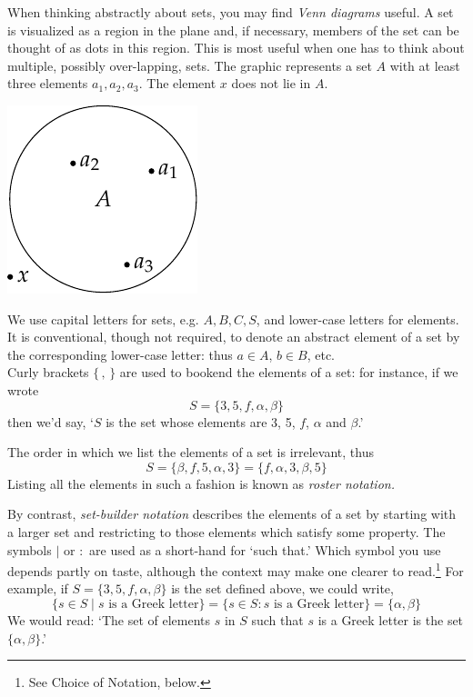 \begin{minipage}[t]{0.73\linewidth}\vspace{0pt}
	When thinking abstractly about sets, you may find \emph{Venn diagrams} useful. A set is visualized as a region in the plane and, if necessary, members of the set can be thought of as dots in this region. This is most useful when one has to think about multiple, possibly over-lapping, sets. The graphic represents a set $A$ with at least three elements $a_1,a_2,a_3$. The element $x$ does not lie in $A$. 
	\vspace{5pt}
\end{minipage}
\hfill
\begin{minipage}[t]{0.25\linewidth}\vspace{0pt}
	\flushright\includegraphics[scale=1]{sets-01-venn}
\end{minipage}



We use capital letters for sets, e.g. $A,B,C,S$, and lower-case letters for elements. It is conventional, though not required, to denote an abstract element of a set by the corresponding lower-case letter: thus $a\in A$, $b\in B$, etc.\\
Curly brackets $\{\,,\,\}$ are used to bookend the elements of a set: for instance, if we wrote
\[
	S=\{3,5,f,\alpha,\beta\}
\]
then we'd say, `$S$ is the set whose elements are 3, 5, $f$, $\alpha$ and $\beta$.'\par
The order in which we list the elements of a set is irrelevant, thus
\[
	S=\{\beta,f,5,\alpha,3\}=\{f,\alpha,3,\beta,5\}
\]
Listing all the elements in such a fashion is known as \emph{roster notation.}

By contrast, \emph{set-builder notation} describes the elements of a set by starting with a larger set and restricting to those elements which satisfy some property. The symbols $\mid$ or $:$ are used as a short-hand for `such that.' Which symbol you use depends partly on taste, although the context may make one clearer to read.\footnote{See Choice of Notation, below.} For example, if $S=\{3,5,f,\alpha,\beta\}$ is the set defined above, we could write,
\[
	\{s\in S\mid s\text{ is a Greek letter}\}=\{s\in S:s\text{ is a Greek letter}\}=\{\alpha,\beta\}
\]
We would read: `The set of elements $s$ in $S$ such that $s$ is a Greek letter is the set $\{\alpha,\beta\}$.'

